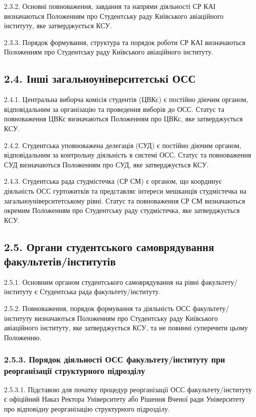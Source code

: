    2.3.2. Основні повноваження, завдання та напрями діяльності СР КАІ визначаються Положенням про Студентську раду Київського авіаційного інституту, яке затверджується КСУ.

    2.3.3. Порядок формування, структура та порядок роботи СР КАІ визначаються Положенням про Студентську раду Київського авіаційного інституту.

\subsection*{2.4. Інші загальноуніверситетські ОСС}
    2.4.1. Центральна виборча комісія студентів (ЦВКс) є постійно діючим органом, відповідальним за організацію та проведення виборів до ОСС. Статус та повноваження ЦВКс визначаються Положенням про ЦВКс, яке затверджується КСУ.

    2.4.2. Студентська уповноважена делегація (СУД) є постійно діючим органом, відповідальним за контрольну діяльність в системі ОСС. Статус та повноваження СУД визначаються Положенням про СУД, яке затверджується КСУ.

    2.4.3. Студентська рада студмістечка (СР СМ) є органом, що координує діяльність ОСС гуртожитків та представляє інтереси мешканців студмістечка на загальноуніверситетському рівні. Статус та повноваження СР СМ визначаються окремим Положенням про Студентську раду студмістечка, яке затверджується КСУ.

\subsection*{2.5. Органи студентського самоврядування факультетів/інститутів}
    2.5.1. Основним органом студентського самоврядування на рівні факультету/інституту є Студентська рада факультету/інституту.

    2.5.2. Повноваження, порядок формування та діяльність ОСС факультету/інституту визначаються Положенням про Студентську раду Київського авіаційного інституту, яке затверджується КСУ, та не повинні суперечити цьому Положенню.

    \subsubsection*{2.5.3. Порядок діяльності ОСС факультету/інституту при реорганізації структурного підрозділу}
        2.5.3.1. Підставою для початку процедур реорганізації ОСС факультету/інституту є офіційний Наказ Ректора Університету або Рішення Вченої ради Університету про відповідну реорганізацію структурного підрозділу.

